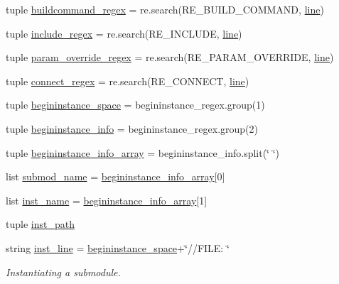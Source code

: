 \begin{DoxyCompactItemize}
\item 
tuple \hyperlink{namespaceveripy_a7f1757c2a06b63c4d45e1943eebdce18}{buildcommand\-\_\-regex} = re.\-search(R\-E\-\_\-\-B\-U\-I\-L\-D\-\_\-\-C\-O\-M\-M\-A\-N\-D, \hyperlink{namespaceveripy_a3cf9cf94513841f0d65d3081b08a55cc}{line})
\item 
tuple \hyperlink{namespaceveripy_a67e40ea20ac72f86e578403f7e1e3e22}{include\-\_\-regex} = re.\-search(R\-E\-\_\-\-I\-N\-C\-L\-U\-D\-E, \hyperlink{namespaceveripy_a3cf9cf94513841f0d65d3081b08a55cc}{line})
\item 
tuple \hyperlink{namespaceveripy_a4270387eaf219f4390fc832df8e279d4}{param\-\_\-override\-\_\-regex} = re.\-search(R\-E\-\_\-\-P\-A\-R\-A\-M\-\_\-\-O\-V\-E\-R\-R\-I\-D\-E, \hyperlink{namespaceveripy_a3cf9cf94513841f0d65d3081b08a55cc}{line})
\item 
tuple \hyperlink{namespaceveripy_aa1760ba945c51eae52f028d1bbbd7fc1}{connect\-\_\-regex} = re.\-search(R\-E\-\_\-\-C\-O\-N\-N\-E\-C\-T, \hyperlink{namespaceveripy_a3cf9cf94513841f0d65d3081b08a55cc}{line})
\item 
tuple \hyperlink{namespaceveripy_a872a1b904cb01bc1072ed8e34f3c468d}{begininstance\-\_\-space} = begininstance\-\_\-regex.\-group(1)
\item 
tuple \hyperlink{namespaceveripy_a0a3f7bc90b80f1eccaf884f40317af5c}{begininstance\-\_\-info} = begininstance\-\_\-regex.\-group(2)
\item 
tuple \hyperlink{namespaceveripy_a7b3d5c606eddfcb4f4e7e1d6c01fac6b}{begininstance\-\_\-info\-\_\-array} = begininstance\-\_\-info.\-split(\char`\"{} \char`\"{})
\item 
list \hyperlink{namespaceveripy_ad4f69029876b9bb2e6cb769770e15fd4}{submod\-\_\-name} = \hyperlink{namespaceveripy_a7b3d5c606eddfcb4f4e7e1d6c01fac6b}{begininstance\-\_\-info\-\_\-array}\mbox{[}0\mbox{]}
\item 
list \hyperlink{namespaceveripy_a7d88d1a02b6ed2027a623447589c4fcd}{inst\-\_\-name} = \hyperlink{namespaceveripy_a7b3d5c606eddfcb4f4e7e1d6c01fac6b}{begininstance\-\_\-info\-\_\-array}\mbox{[}1\mbox{]}
\item 
tuple \hyperlink{namespaceveripy_a5d77e0ab80b227fb0d6ea69a873da94c}{inst\-\_\-path}
\item 
string \hyperlink{namespaceveripy_a8f89f48fcf9323bd5bb9de7d5656a783}{inst\-\_\-line} = \hyperlink{namespaceveripy_a872a1b904cb01bc1072ed8e34f3c468d}{begininstance\-\_\-space}+\char`\"{}//F\-I\-L\-E\-: \char`\"{}
\begin{DoxyCompactList}\small\item\em Instantiating a submodule. \end{DoxyCompactList}\item 

\end{DoxyCompactItemize}

